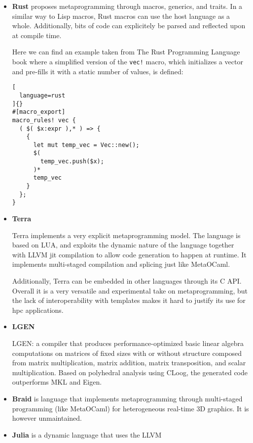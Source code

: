 \documentclass[../main]{subfiles}
\begin{document}
\begin{itemize}

\item
\textbf{Rust} proposes metaprogramming through macros, generics, and traits.
In a similar way to Lisp macros, Rust macros can use the host language
as a whole. Additionally, bits of code can explicitely be parsed and reflected
upon at compile time.

Here we can find an example taken from The Rust Programming Language
book \cite{rust-book} where a simplified version of the \lstinline{vec!} macro,
which initializes a vector and pre-fills it with a static number of values,
is defined:

\begin{lstlisting}[
  language=rust
]{}
#[macro_export]
macro_rules! vec {
  ( $( $x:expr ),* ) => {
    {
      let mut temp_vec = Vec::new();
      $(
        temp_vec.push($x);
      )*
      temp_vec
    }
  };
}
\end{lstlisting}

\item
\textbf{Terra}

Terra\cite{terra} implements a very explicit metaprogramming model.
The language is based on LUA, and exploits the dynamic nature of the language
together with LLVM \gls{jit} compilation to allow code generation
to happen at runtime.
It implements multi-staged compilation and splicing just like MetaOCaml.

Additionally, Terra can be embedded in other languages through its C API.
Overall it is a very versatile and experimental take on metaprogramming,
but the lack of interoperability with \cpp templates makes it hard to justify
its use for \gls{hpc} applications.


\item
\textbf{LGEN}

LGEN\cite{hpcs15}:
a compiler that produces performance-optimized
basic linear algebra computations on matrices
of fixed sizes with or without structure composed
from matrix multiplication, matrix addition, matrix
transposition, and scalar multiplication. Based on
polyhedral analysis using CLoog, the generated code
outperforms MKL and Eigen.


\item
\textbf{Braid} \cite{braid} is language that implements metaprogramming
through multi-staged programming (like MetaOCaml) for heterogeneous real-time
3D graphics. It is however unmaintained.

\item
\textbf{Julia} \cite{julia} is a dynamic language that uses the LLVM

\end{itemize}
\end{document}
